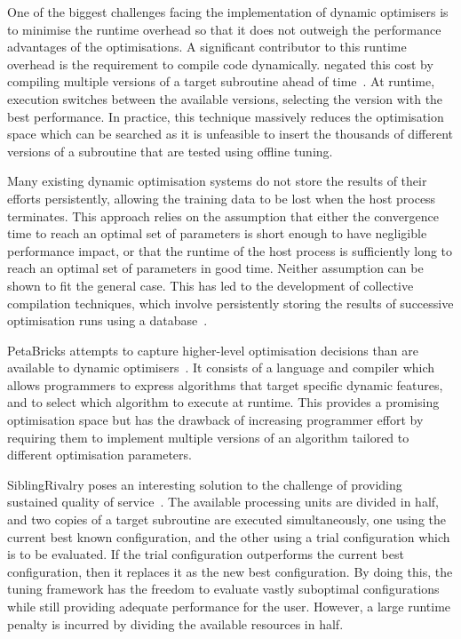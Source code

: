 One of the biggest challenges facing the implementation of dynamic
optimisers is to minimise the runtime overhead so that it does not
outweigh the performance advantages of the optimisations. A
significant contributor to this runtime overhead is the requirement to
compile code dynamically. \citeauthor{Fursin2005} negated this cost by
compiling multiple versions of a target subroutine ahead of
time~\cite{Fursin2005}. At runtime, execution switches between the
available versions, selecting the version with the best
performance. In practice, this technique massively reduces the
optimisation space which can be searched as it is unfeasible to insert
the thousands of different versions of a subroutine that are tested
using offline tuning.

Many existing dynamic optimisation systems do not store the results of
their efforts persistently, allowing the training data to be lost when
the host process terminates. This approach relies on the assumption
that either the convergence time to reach an optimal set of parameters
is short enough to have negligible performance impact, or that the
runtime of the host process is sufficiently long to reach an optimal
set of parameters in good time. Neither assumption can be shown to fit
the general case. This has led to the development of collective
compilation techniques, which involve persistently storing the results
of successive optimisation runs using a database~\cite{Fursin2010}.

PetaBricks attempts to capture higher-level optimisation decisions
than are available to dynamic optimisers~\cite{Ansel2009a}. It
consists of a language and compiler which allows programmers to
express algorithms that target specific dynamic features, and to
select which algorithm to execute at runtime. This provides a
promising optimisation space but has the drawback of increasing
programmer effort by requiring them to implement multiple versions of
an algorithm tailored to different optimisation parameters.

SiblingRivalry poses an interesting solution to the challenge of
providing sustained quality of service~\cite{Ansel2012}. The available
processing units are divided in half, and two copies of a target
subroutine are executed simultaneously, one using the current best
known configuration, and the other using a trial configuration which
is to be evaluated. If the trial configuration outperforms the current
best configuration, then it replaces it as the new best
configuration. By doing this, the tuning framework has the freedom to
evaluate vastly suboptimal configurations while still providing
adequate performance for the user. However, a large runtime penalty is
incurred by dividing the available resources in half.

